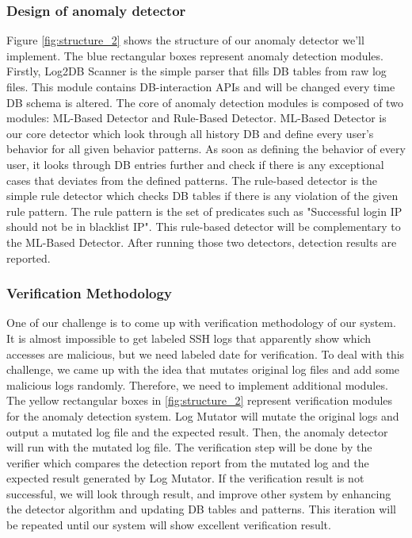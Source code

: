 \documentclass [11pt]{article}
\begin{document}
\subsubsection{Design of anomaly detector}
Figure \ref{fig:structure_2} shows the structure of our anomaly detector we'll implement. The blue rectangular boxes represent anomaly detection modules. Firstly, Log2DB Scanner is the simple parser that fills DB tables from raw log files. This module contains DB-interaction APIs and will be changed every time DB schema is altered. The core of anomaly detection modules is composed of two modules: ML-Based Detector and Rule-Based Detector. ML-Based Detector is our core detector which look through all history DB and define every user's behavior for all given behavior patterns. As soon as defining the behavior of every user, it looks through DB entries further and check if there is any exceptional cases that deviates from the defined patterns. The rule-based detector is the simple rule detector which checks DB tables if there is any violation of the given rule pattern. The rule pattern is the set of predicates such as "Successful login IP should not be in blacklist IP". This rule-based detector will be complementary to the ML-Based Detector. After running those two detectors, detection results are reported.
\subsubsection{Verification Methodology}
One of our challenge is to come up with verification methodology of our system. It is almost impossible to get labeled SSH logs that apparently show which accesses are malicious, but we need labeled date for verification. To deal with this challenge, we came up with the idea that mutates original log files and add some malicious logs randomly. Therefore, we need to implement additional modules. The yellow rectangular boxes in \ref{fig:structure_2} represent verification modules for the anomaly detection system. Log Mutator will mutate the original logs and output a mutated log file and the expected result. Then, the anomaly detector will run with the mutated log file. The verification step will be done by the verifier which compares the detection report from the mutated log and the expected result generated by Log Mutator. If the verification result is not successful, we will look through result, and improve other system by enhancing the detector algorithm and updating DB tables and patterns. This iteration will be repeated until our system will show excellent verification result.
\end{document}
